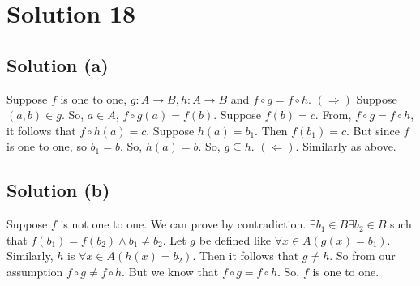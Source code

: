\documentclass{article}
\begin{document}
\section{Solution 18}
\subsection{Solution (a)}
Suppose $f$ is one to one, $g:A \to B, h: A \to B$ and $f \circ g = f
\circ h$.
$(\Rightarrow)$ Suppose $(a,b) \in g$. So, $a \in A$, $f \circ g(a) =
f(b)$. Suppose $f(b) = c$. From, $f \circ g = f \circ h$, it follows
that $f \circ h(a) = c$. Suppose $h(a) = b_1$. Then $f(b_1) = c$. But
since $f$ is one to one, so $b_1 = b$. So, $h(a) = b$. So, $g
\subseteq h$.
$(\Leftarrow)$. Similarly as above.

\subsection{Solution (b)}
Suppose $f$ is not one to one. We can prove by contradiction. $\exists
b_1 \in B \exists b_2 \in B$ such that $f(b_1) = f(b_2) \land b_1 \neq
b_2$. Let $g$ be defined like $\forall x \in A(g(x) = b_1)$.
Similarly, $h$ is $\forall x \in A(h(x) = b_2)$. Then it follows that
$g \neq h$. So from our assumption $f \circ g \neq f \circ h$. But we
know that $f \circ g = f \circ h$. So, $f$ is one to one.
\end{document}
